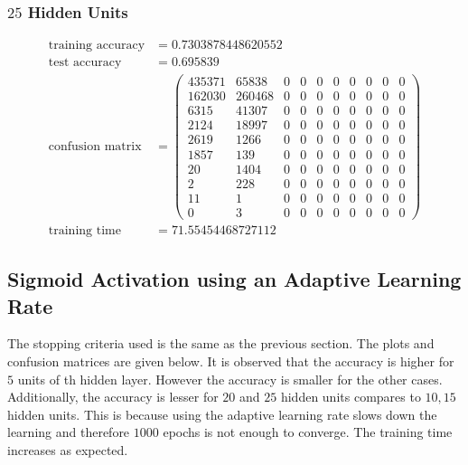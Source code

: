 \documentclass[11pt]{article}
\begin{document}
\subsubsection{$25$ Hidden Units}
\begin{equation}
  \begin{split}
    \text{training accuracy} &= 0.7303878448620552\\
    \text{test accuracy} &= 0.695839\\
    \text{confusion matrix} &=
    \begin{pmatrix}
      435371 & 65838  & 0 & 0 & 0 & 0 & 0 & 0 & 0 & 0 \\
      162030 & 260468 & 0 & 0 & 0 & 0 & 0 & 0 & 0 & 0 \\
      6315   & 41307  & 0 & 0 & 0 & 0 & 0 & 0 & 0 & 0 \\
      2124   & 18997  & 0 & 0 & 0 & 0 & 0 & 0 & 0 & 0 \\
      2619   & 1266   & 0 & 0 & 0 & 0 & 0 & 0 & 0 & 0 \\
      1857   & 139    & 0 & 0 & 0 & 0 & 0 & 0 & 0 & 0 \\
      20     & 1404   & 0 & 0 & 0 & 0 & 0 & 0 & 0 & 0 \\
      2      & 228    & 0 & 0 & 0 & 0 & 0 & 0 & 0 & 0 \\
      11     & 1      & 0 & 0 & 0 & 0 & 0 & 0 & 0 & 0 \\
      0      & 3      & 0 & 0 & 0 & 0 & 0 & 0 & 0 & 0
    \end{pmatrix}\\
    \text{training time} &= 71.55454468727112
  \end{split}
\end{equation}

\subsection{Sigmoid Activation using an Adaptive Learning Rate}
The stopping criteria used is the same as the previous section. The plots and confusion matrices are given below. It is observed that the accuracy is higher for $5$ units of th hidden layer. However the accuracy is smaller for the other cases. Additionally, the accuracy is lesser for $20$ and $25$ hidden units compares to $10, 15$ hidden units. This is because using the adaptive learning rate slows down the learning and therefore $1000$ epochs is not enough to converge. The training time increases as expected.
\end{document}
